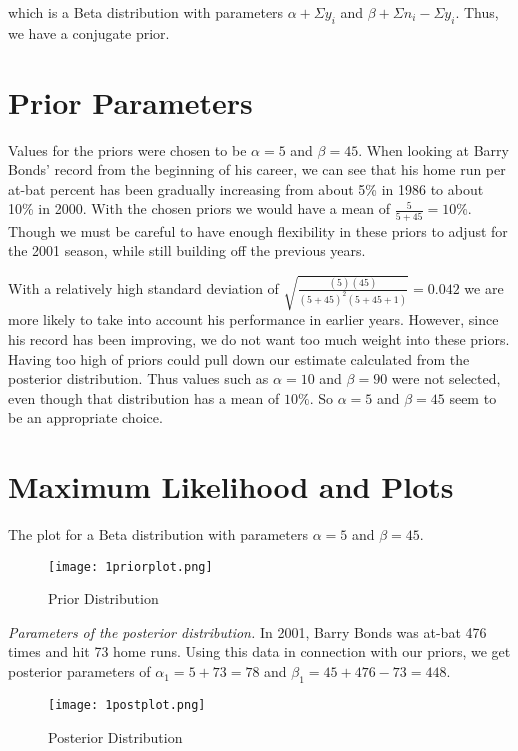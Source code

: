 \documentclass[12pt]{article}
\begin{document}
\noindent which is a Beta distribution with parameters $\alpha+\Sigma y_i$ and $\beta+\Sigma n_i-\Sigma y_i$.  Thus, we have a conjugate prior.

\section*{Prior Parameters}

\noindent Values for the priors were chosen to be $\alpha=5$ and $\beta=45$.  When looking at Barry Bonds' record from the beginning of his career, we can see that his home run per at-bat percent has been gradually increasing from about 5\% in 1986 to about 10\% in 2000.  With the chosen priors we would have a mean of $\frac{5}{5+45}=10\%$.  Though we must be careful to have enough flexibility in these priors to adjust for the 2001 season, while still building off the previous years.
\bigskip

\noindent With a relatively high standard deviation of $\sqrt{\frac{(5)(45)}{(5+45)^2(5+45+1)}}=0.042$ we are more likely to take into account his performance in earlier years.  However, since his record has been improving, we do not want too much weight into these priors.  Having too high of priors could pull down our estimate calculated from the posterior distribution.  Thus values such as $\alpha=10$ and $\beta=90$ were not selected, even though that distribution has a mean of $10\%$.  So $\alpha=5$ and $\beta=45$ seem to be an appropriate choice.
\bigskip


\section*{Maximum Likelihood and Plots}

\noindent The plot for a Beta distribution with parameters $\alpha=5$ and $\beta=45$.

\begin{figure}[H]
\begin{center}
\texttt{[image: 1priorplot.png]}
\caption{Prior Distribution}
\end{center}
\end{figure}
\bigskip
\bigskip
\bigskip

\noindent \textit{Parameters of the posterior distribution.}  In 2001, Barry Bonds was at-bat 476 times and hit 73 home runs.  Using this data in connection with our priors, we get posterior parameters of $\alpha_1=5+73=78$ and $\beta_1=45+476-73=448$.

\begin{figure}[H]
\begin{center}
\texttt{[image: 1postplot.png]}
\caption{Posterior Distribution}
\end{center}
\end{figure}
\end{document}
